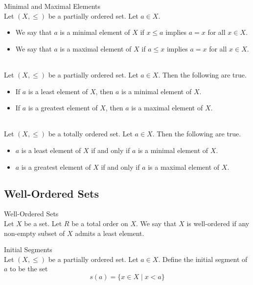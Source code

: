 \documentclass[a4paper]{article}
\begin{document}
\begin{defn}{Minimal and Maximal Elements}{}\\
Let $(X,\leq)$ be a partially ordered set. Let $a\in X$. 
\begin{itemize}
\item We say that $a$ is a minimal element of $X$ if $x\leq a$ implies $a=x$ for all $x\in X$. 
\item We say that $a$ is a maximal element of $X$ if $a\leq x$ implies $a=x$ for all $x\in X$. 
\end{itemize}
\end{defn}

\begin{prp}{}{}\\
Let $(X,\leq)$ be a partially ordered set. Let $a\in X$. Then the following are true. 
\begin{itemize}
\item If $a$ is a least element of $X$, then $a$ is a minimal element of $X$. 
\item If $a$ is a greatest element of $X$, then $a$ is a maximal element of $X$. 
\end{itemize}
\end{prp}

\begin{prp}{}{}\\
Let $(X,\leq)$ be a totally ordered set. Let $a\in X$. Then the following are true. 
\begin{itemize}
\item $a$ is a least element of $X$ if and only if $a$ is a minimal element of $X$. 
\item $a$ is a greatest element of $X$ if and only if $a$ is a maximal element of $X$. 
\end{itemize}
\end{prp}

\subsection{Well-Ordered Sets}
\begin{defn}{Well-Ordered Sets}{}\\
Let $X$ be a set. Let $R$ be a total order on $X$. We say that $X$ is well-ordered if any non-empty subset of $X$ admits a least element. 
\end{defn}

\begin{defn}{Initial Segments}{}\\
Let $(X,\leq)$ be a partially ordered set. Let $a\in X$. Define the initial segment of $a$ to be the set $$s(a)=\{x\in X\;|\;x<a\}$$
\end{defn}
\end{document}
